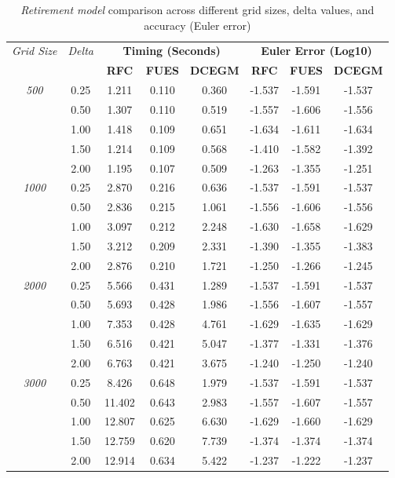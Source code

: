 
\begin{table}[htbp]
\centering
\small
\begin{tabular}{ccccc|ccc}
\toprule
\multirow{2}{*}{\textit{Grid Size}} & \multirow{2}{*}{\textit{Delta}} & \multicolumn{3}{c}{\textbf{Timing (Seconds)}} & \multicolumn{3}{c}{\textbf{Euler Error (Log10)}} \\
 & & \textbf{RFC} & \textbf{FUES} & \textbf{DCEGM} & \textbf{RFC} & \textbf{FUES} & \textbf{DCEGM} \\
\midrule
\multirow{5}{*}{\textit{500}} 
 & 0.25 & 1.211 & 0.110 & 0.360 & -1.537 & -1.591 & -1.537 \\
 & 0.50 & 1.307 & 0.110 & 0.519 & -1.557 & -1.606 & -1.556 \\
 & 1.00 & 1.418 & 0.109 & 0.651 & -1.634 & -1.611 & -1.634 \\
 & 1.50 & 1.214 & 0.109 & 0.568 & -1.410 & -1.582 & -1.392 \\
 & 2.00 & 1.195 & 0.107 & 0.509 & -1.263 & -1.355 & -1.251 \\
\midrule
\multirow{5}{*}{\textit{1000}} 
 & 0.25 & 2.870 & 0.216 & 0.636 & -1.537 & -1.591 & -1.537 \\
 & 0.50 & 2.836 & 0.215 & 1.061 & -1.556 & -1.606 & -1.556 \\
 & 1.00 & 3.097 & 0.212 & 2.248 & -1.630 & -1.658 & -1.629 \\
 & 1.50 & 3.212 & 0.209 & 2.331 & -1.390 & -1.355 & -1.383 \\
 & 2.00 & 2.876 & 0.210 & 1.721 & -1.250 & -1.266 & -1.245 \\
\midrule
\multirow{5}{*}{\textit{2000}} 
 & 0.25 & 5.566 & 0.431 & 1.289 & -1.537 & -1.591 & -1.537 \\
 & 0.50 & 5.693 & 0.428 & 1.986 & -1.556 & -1.607 & -1.557 \\
 & 1.00 & 7.353 & 0.428 & 4.761 & -1.629 & -1.635 & -1.629 \\
 & 1.50 & 6.516 & 0.421 & 5.047 & -1.377 & -1.331 & -1.376 \\
 & 2.00 & 6.763 & 0.421 & 3.675 & -1.240 & -1.250 & -1.240 \\
\midrule
\multirow{5}{*}{\textit{3000}} 
 & 0.25 & 8.426 & 0.648 & 1.979 & -1.537 & -1.591 & -1.537 \\
 & 0.50 & 11.402 & 0.643 & 2.983 & -1.557 & -1.607 & -1.557 \\
 & 1.00 & 12.807 & 0.625 & 6.630 & -1.629 & -1.660 & -1.629 \\
 & 1.50 & 12.759 & 0.620 & 7.739 & -1.374 & -1.374 & -1.374 \\
 & 2.00 & 12.914 & 0.634 & 5.422 & -1.237 & -1.222 & -1.237 \\
\midrule

\bottomrule
\end{tabular}
\caption{\textit{Retirement model} comparison across different grid sizes, delta values, and accuracy (Euler error)}
\label{tab:timing_comparison}
\end{table}
